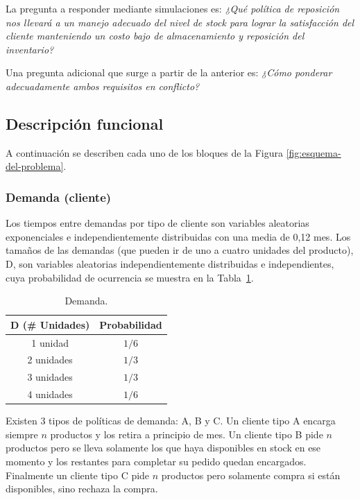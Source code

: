 \documentclass[10pt]{article}
\begin{document}
La pregunta a responder mediante simulaciones es:
\textit{¿Qué política de reposición nos llevará a un manejo adecuado del nivel de stock para lograr la satisfacción del cliente manteniendo un costo bajo de almacenamiento y reposición del inventario?}

Una pregunta adicional que surge a partir de la anterior es:
\textit{¿Cómo ponderar adecuadamente ambos requisitos en conflicto?}
\FloatBarrier

\subsection{Descripción funcional}
A continuación se describen cada uno de los bloques de la Figura \ref{fig:esquema-del-problema}.

\subsubsection{Demanda (cliente)\label{sec:CLI}}
Los tiempos entre demandas por tipo de cliente son variables aleatorias exponenciales e independientemente distribuidas con una media de 0,12 mes. Los tamaños de las demandas (que pueden ir de uno a cuatro unidades del producto), D, son variables aleatorias independientemente distribuidas e independientes, cuya probabilidad de ocurrencia se muestra en la Tabla~\ref{tab:tabla1}.

\begin{table}[ht]
\begin{center}
\begin{tabular}{cc}
\toprule
\textbf{D (\# Unidades)} & \textbf{Probabilidad}\\
\midrule
1 unidad & $1/6$\\
2 unidades & $1/3$\\
3 unidades & $1/3$\\
4 unidades & $1/6$\\
\bottomrule
\end{tabular}
\end{center}
\caption{Demanda.}
\label{tab:tabla1}
\end{table}

Existen 3 tipos de políticas de demanda: A, B y C.
Un cliente tipo A encarga siempre $n$ productos y los retira a principio de mes. Un cliente tipo B pide $n$ productos pero se lleva solamente los que haya disponibles en stock en ese momento y los restantes para completar su pedido quedan encargados. Finalmente un cliente tipo C pide $n$ productos pero solamente compra si están disponibles, sino rechaza la compra.
\end{document}
